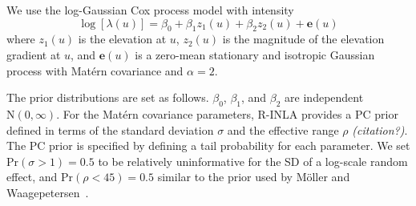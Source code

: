 \documentclass[]{interact}
\begin{document}
We use the log-Gaussian Cox process model with intensity
\begin{displaymath}
\log\left[\lambda(u)\right] = \beta_{0} + \beta_{1} z_{1}(u)
+ \beta_{2} z_{2}(u) + \mathbf{e}(u)
\end{displaymath}
where \(z_{1}(u)\) is the elevation at \(u\), \(z_{2}(u)\) is the magnitude of
the elevation gradient at \(u\), and \(\mathbf{e}(u)\) is a zero-mean
stationary and isotropic Gaussian process with Mat\'{e}rn covariance and
\(\alpha = 2\).

The prior distributions are set as follows. \(\beta_{0}\), \(\beta_{1}\), and
\(\beta_{2}\) are independent \(\mathrm{N}(0, \infty)\). For the Mat\'{e}rn
covariance parameters, R-INLA provides a PC prior defined in terms of the
standard deviation \(\sigma\) and the effective range \(\rho\) {\it (citation?)}.
The PC prior is specified by defining a tail probability for each parameter. We
set \(\mathrm{Pr}(\sigma > 1) = 0.5\) to be relatively uninformative for the
SD of a log-scale random effect, and \(\mathrm{Pr}(\rho < 45) = 0.5\) similar
to the prior used by M\"{o}ller and Waagepetersen~\cite{moellerwaagepetersen}.
\end{document}
